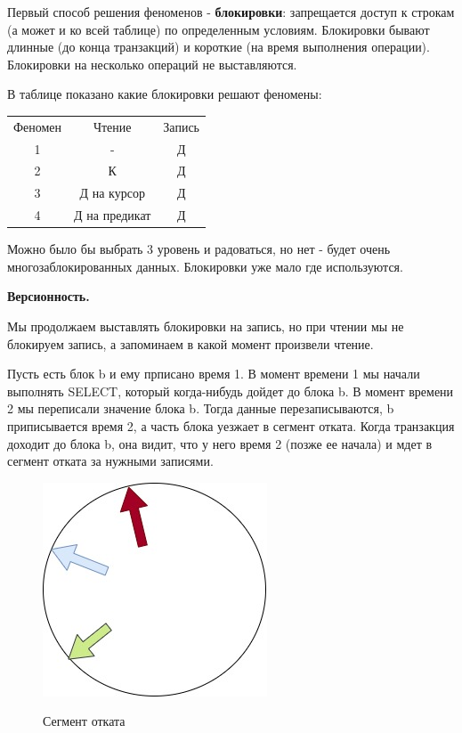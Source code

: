 Первый способ решения феноменов - \textbf{блокировки}: запрещается доступ к строкам (а может и ко всей таблице) по определенным условиям. Блокировки бывают длинные (до конца транзакций) и короткие (на время выполнения операции). Блокировки на несколько операций не выставляются. 

В таблице показано какие блокировки решают феномены:

\begin{center}
	\begin{tabular}{c|c c}
		Феномен & Чтение & Запись \\
		1 & - & Д \\
		2 & К & Д\\
		3 & Д на курсор & Д \\
		4 & Д на предикат & Д\\
	\end{tabular}
\end{center}

Можно было бы выбрать 3 уровень и радоваться, но нет - будет очень многозаблокированных данных. Блокировки уже мало где используются. 

\textbf{Версионность.} 

Мы продолжаем выставлять блокировки на запись, но при чтении мы не блокируем запись, а запоминаем в какой момент произвели чтение. 

Пусть есть блок b и ему прписано время 1. В момент времени 1 мы начали выполнять SELECT, который когда-нибудь дойдет до блока b. В момент времени 2 мы переписали значение блока b. Тогда данные перезаписываются, b приписывается время 2, а часть блока уезжает в сегмент отката. Когда транзакция доходит до блока b, она видит, что у него время 2 (позже ее начала) и мдет в сегмент отката за нужными записями. 

\begin{figure}[H]
	\centering
	\includegraphics[scale = 0.5]{6/vers.jpg}
	\label{fig:vers}
	\caption{Сегмент отката}
	
\end{figure}


